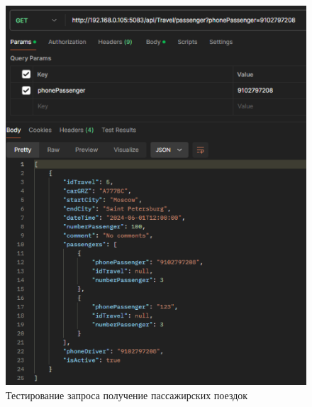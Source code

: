 \begin{figure}[H]
	\centering
	\includegraphics[width=0.9\linewidth]{images/test8}
	\caption{Тестирование запроса получение пассажирских поездок}
	\label{fig:test8}
\end{figure}

